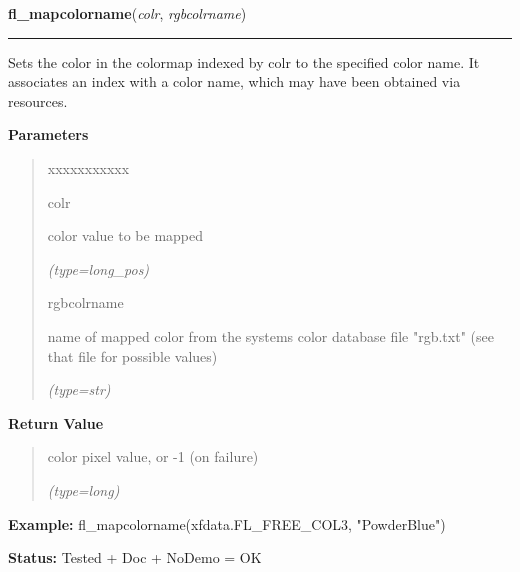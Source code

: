     \label{xformslib:flbasic:fl_mapcolorname}

    \vspace{0.5ex}

\hspace{.8\funcindent}\begin{boxedminipage}{\funcwidth}

    \raggedright \textbf{fl\_mapcolorname}(\textit{colr}, \textit{rgbcolrname})

    \vspace{-1.5ex}

    \rule{\textwidth}{0.5\fboxrule}
\setlength{\parskip}{2ex}
    Sets the color in the colormap indexed by colr to the specified color 
    name. It associates an index with a color name, which may have been 
    obtained via resources.

\setlength{\parskip}{1ex}
      \textbf{Parameters}
      \vspace{-1ex}

      \begin{quote}
        \begin{Ventry}{xxxxxxxxxxx}

          \item[colr]

          color value to be mapped

            {\it (type=long\_pos)}

          \item[rgbcolrname]

          name of mapped color from the systems color database file 
          "rgb.txt" (see that file for possible values)

            {\it (type=str)}

        \end{Ventry}

      \end{quote}

      \textbf{Return Value}
    \vspace{-1ex}

      \begin{quote}
      color pixel value, or -1 (on failure)

      {\it (type=long)}

      \end{quote}

\textbf{Example:} fl\_mapcolorname(xfdata.FL\_FREE\_COL3, "PowderBlue")



\textbf{Status:} Tested + Doc + NoDemo = OK



    \end{boxedminipage}

